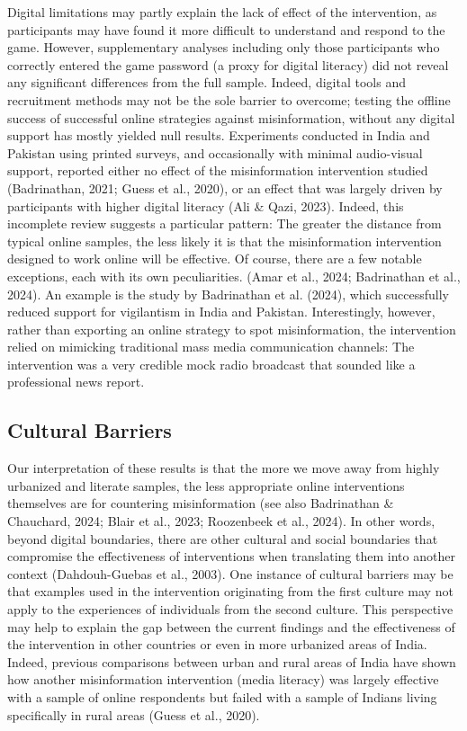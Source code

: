 \documentclass[authordate, reflection, issue]{jote-new-article}
\begin{document}
	Digital limitations may partly explain the lack of effect of the intervention, as participants may have found it more difficult to understand and respond to the game. However, supplementary analyses including only those participants who correctly entered the game password (a proxy for digital literacy) did not reveal any significant differences from the full sample. Indeed, digital tools and recruitment methods may not be the sole barrier to overcome; testing the offline success of successful online strategies against misinformation, without any digital support has mostly yielded null results. Experiments conducted in India and Pakistan using printed surveys, and occasionally with minimal audio-visual support, reported either no effect of the misinformation intervention studied (Badrinathan, 2021; Guess et al., 2020), or an effect that was largely driven by participants with higher digital literacy (Ali \& Qazi, 2023). Indeed, this incomplete review suggests a particular pattern: The greater the distance from typical online samples, the less likely it is that the misinformation intervention designed to work online will be effective. Of course, there are a few notable exceptions, each with its own peculiarities. (Amar et al., 2024; Badrinathan et al., 2024). An example is the study by Badrinathan et al. (2024), which successfully reduced support for vigilantism in India and Pakistan. Interestingly, however, rather than exporting an online strategy to spot misinformation, the intervention relied on mimicking traditional mass media communication channels: The intervention was a very credible mock radio broadcast that sounded like a professional news report.



	\subsection{Cultural Barriers}



	 Our interpretation of these results is that the more we move away from highly urbanized and literate samples, the less appropriate online interventions themselves are for countering misinformation (see also Badrinathan \& Chauchard, 2024; Blair et al., 2023; Roozenbeek et al., 2024). In other words, beyond digital boundaries, there are other cultural and social boundaries that compromise the effectiveness of interventions when translating them into another context (Dahdouh-Guebas et al., 2003). One instance of cultural barriers may be that examples used in the intervention originating from the first culture may not apply to the experiences of individuals from the second culture. This perspective may help to explain the gap between the current findings and the effectiveness of the intervention in other countries or even in more urbanized areas of India. Indeed, previous comparisons between urban and rural areas of India have shown how another misinformation intervention (media literacy) was largely effective with a sample of online respondents but failed with a sample of Indians living specifically in rural areas (Guess et al., 2020).
\end{document}
